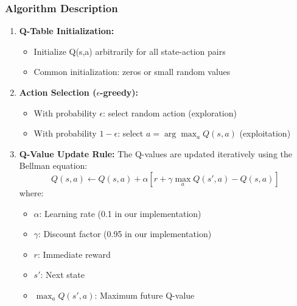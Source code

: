 \documentclass[a4paper, 12pt]{article}
\begin{document}
\subsubsection{Algorithm Description}
\begin{tcolorbox}[title=Q-Learning Core Components]
\begin{enumerate}
    \item \textbf{Q-Table Initialization:}
    \begin{itemize}
        \item Initialize Q(s,a) arbitrarily for all state-action pairs
        \item Common initialization: zeros or small random values
    \end{itemize}

    \item \textbf{Action Selection ($\epsilon$-greedy):}
    \begin{itemize}
        \item With probability $\epsilon$: select random action (exploration)
        \item With probability $1-\epsilon$: select $a = \arg\max_a Q(s,a)$ (exploitation)
    \end{itemize}

    \item \textbf{Q-Value Update Rule:}
    The Q-values are updated iteratively using the Bellman equation:
    \[
    Q(s, a) \gets Q(s, a) + \alpha \left[ r + \gamma \max_a Q(s', a) - Q(s, a) \right]
    \]
    where:
    \begin{itemize}
        \item \( \alpha \): Learning rate (0.1 in our implementation)
        \item \( \gamma \): Discount factor (0.95 in our implementation)
        \item \( r \): Immediate reward
        \item \( s' \): Next state
        \item \( \max_a Q(s', a) \): Maximum future Q-value
    \end{itemize}
\end{enumerate}
\end{tcolorbox}
\end{document}
